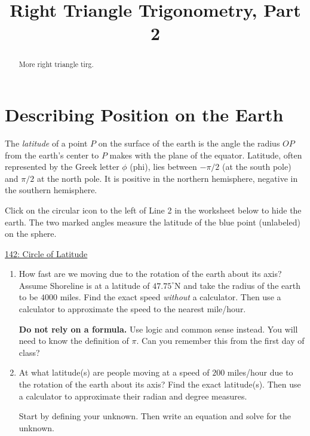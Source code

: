 \documentclass{ximera}
\title{Right Triangle Trigonometry, Part 2}
\begin{document}
\begin{abstract}
More right triangle tirg.
\end{abstract}
\maketitle


\section{Describing Position on the Earth}

The \emph{latitude} of a point $P$ on the surface of the earth is the angle the radius $OP$ from the earth's center to $P$ makes with the plane of the equator. Latitude, often represented by the Greek letter $\phi$ (phi), lies between $-\pi/2$ (at the south pole) and $\pi/2$ at the north pole. It is positive in the northern hemisphere, negative in the southern hemisphere.

Click on the circular icon to the left of Line 2 in the worksheet below to hide the earth. The two marked angles measure the latitude of the blue point (unlabeled) on the sphere.

\begin{onlineOnly}
    \begin{center}
\end{center}
\end{onlineOnly}

\href{https://www.desmos.com/3d/1zzigifhrx}{142: Circle of Latitude}


\begin{question} \label{Qfksadfsdt4e4}
\begin{enumerate}
\item How fast are we moving due to the rotation of the earth about its axis? Assume Shoreline is at a latitude of $47.75^\circ$N and take the radius of the earth to be $4000$ miles. Find the exact speed \emph{without} a calculator. Then use a calculator to approximate the speed to the nearest mile/hour.

{\bf Do not rely on a formula.} Use logic and common sense instead. You will need to know the definition of $\pi$. Can you remember this from the first day of class?

\item At what latitude(s) are people moving at a speed of $200$ miles/hour due to the rotation of the earth about its axis? Find the exact latitude(s). Then use a calculator to approximate their radian and degree measures.

Start by defining your unknown. Then write an equation and solve for the unknown.
\end{enumerate}
\end{question}
\end{document}
